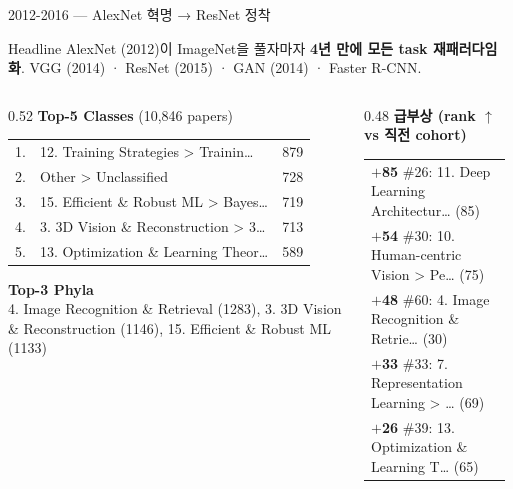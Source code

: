 \documentclass[aspectratio=169,t]{beamer}
\newcommand{\hot}[1]{\textcolor{accentorange}{\textbf{#1}}}
\newcommand{\muted}[1]{\textcolor{mutedgray}{#1}}
\begin{document}
\begin{frame}{2012-2016 \quad — \quad AlexNet 혁명 → ResNet 정착}
\small
\begin{block}{Headline}
AlexNet (2012)이 ImageNet을 풀자마자 \hot{4년 만에 모든 task 재패러다임화}. VGG (2014) · ResNet (2015) · GAN (2014) · Faster R-CNN.
\end{block}
\vspace{4pt}

\begin{columns}[T,onlytextwidth]
\begin{column}{0.52\textwidth}
\textbf{Top-5 Classes} \muted{\scriptsize (10,846 papers)}\\[2pt]
\scriptsize
\begin{tabular}{@{}rlr@{}}
    1. & 12. Training Strategies > Trainin… & 879 \\
    2. & Other > Unclassified & 728 \\
    3. & 15. Efficient \& Robust ML > Bayes… & 719 \\
    4. & 3. 3D Vision \& Reconstruction > 3… & 713 \\
    5. & 13. Optimization \& Learning Theor… & 589 \\
\end{tabular}
\vspace{8pt}

\textbf{\small Top-3 Phyla}\\[2pt]
\scriptsize 4. Image Recognition \& Retrieval (1283), 3. 3D Vision \& Reconstruction (1146), 15. Efficient \& Robust ML (1133)
\end{column}

\begin{column}{0.48\textwidth}
\textbf{급부상 (rank $\uparrow$ vs 직전 cohort)}\\[2pt]
\scriptsize
\begin{tabular}{@{}p{0.95\linewidth}@{}}
    \hot{$+$85} \#26: 11. Deep Learning Architectur… (85) \\
    \hot{$+$54} \#30: 10. Human-centric Vision > Pe… (75) \\
    \hot{$+$48} \#60: 4. Image Recognition \& Retrie… (30) \\
    \hot{$+$33} \#33: 7. Representation Learning > … (69) \\
    \hot{$+$26} \#39: 13. Optimization \& Learning T… (65) \\
\end{tabular}
\end{column}
\end{columns}
\end{frame}
\end{document}
